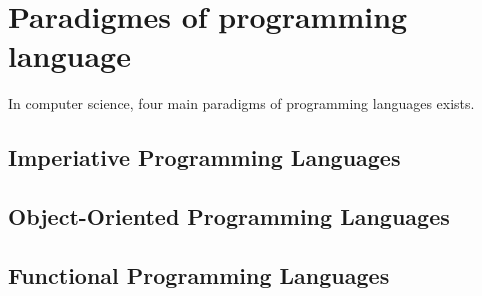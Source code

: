 \section{Paradigmes of programming language}
In computer science, four main paradigms of programming languages exists. \citep{ProgrammingParadigms}
\subsection{Imperiative Programming Languages}
\subsection{Object-Oriented Programming Languages}
\subsection{Functional Programming Languages}